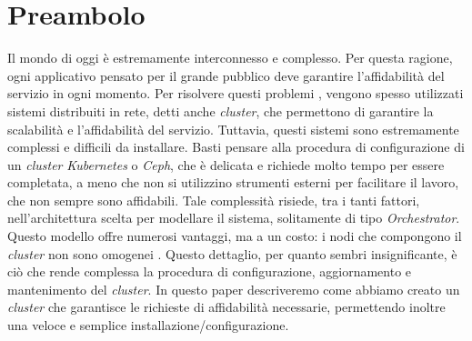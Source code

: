 
\section{Preambolo}
Il mondo di oggi è estremamente interconnesso e complesso. Per questa ragione, ogni applicativo pensato per il grande pubblico deve garantire l'affidabilità del servizio in ogni momento. Per risolvere questi problemi %
, vengono spesso utilizzati sistemi distribuiti in rete, detti anche \textit{cluster}, che permettono di garantire la scalabilità e l'affidabilità del servizio. Tuttavia, questi sistemi sono estremamente complessi e difficili da installare. Basti pensare alla procedura di configurazione di un \textit{cluster} \textit{Kubernetes} o \textit{Ceph}, che è delicata e richiede molto tempo per essere completata, a meno che non si utilizzino strumenti esterni %
per facilitare il lavoro, che non sempre sono affidabili. Tale complessità risiede, tra i tanti fattori, nell'architettura scelta per modellare il sistema, solitamente di tipo \textit{Orchestrator}. Questo modello offre numerosi vantaggi, ma a un costo: i nodi che compongono il \textit{cluster} non sono omogenei %
. Questo dettaglio, per quanto sembri insignificante, è ciò che rende complessa la procedura di configurazione, aggiornamento e mantenimento del \textit{cluster}. In questo paper descriveremo come abbiamo creato un \textit{cluster} che garantisce le richieste di affidabilità necessarie, permettendo inoltre una veloce e semplice installazione/configurazione.
